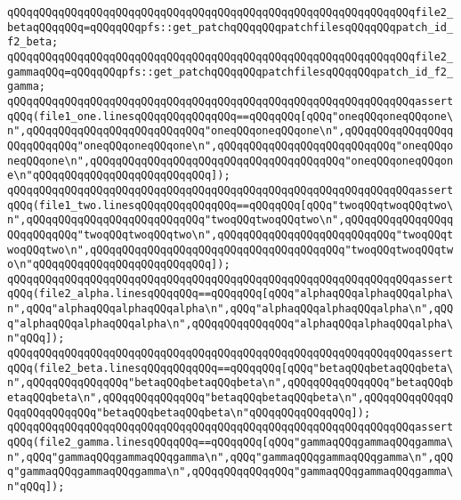 \verb|qQQqqQQqqQQqqQQqqQQqqQQqqQQqqQQqqQQqqQQqqQQqqQQqqQQqqQQqqQQqqQQqfile2_betaqQQqqQQq=qQQqqQQqpfs::get_patchqQQqqQQqpatchfilesqQQqqQQqpatch_id_f2_beta;|\newline
\verb|qQQqqQQqqQQqqQQqqQQqqQQqqQQqqQQqqQQqqQQqqQQqqQQqqQQqqQQqqQQqqQQqfile2_gammaqQQq=qQQqqQQqpfs::get_patchqQQqqQQqpatchfilesqQQqqQQqpatch_id_f2_gamma;|\newline
\newline
\verb|qQQqqQQqqQQqqQQqqQQqqQQqqQQqqQQqqQQqqQQqqQQqqQQqqQQqqQQqqQQqqQQqassertqQQq(file1_one.linesqQQqqQQqqQQqqQQq==qQQqqQQq[qQQq"oneqQQqoneqQQqone\n",qQQqqQQqqQQqqQQqqQQqqQQqqQQq"oneqQQqoneqQQqone\n",qQQqqQQqqQQqqQQqqQQqqQQqqQQq"oneqQQqoneqQQqone\n",qQQqqQQqqQQqqQQqqQQqqQQqqQQq"oneqQQqoneqQQqone\n",qQQqqQQqqQQqqQQqqQQqqQQqqQQqqQQqqQQqqQQq"oneqQQqoneqQQqone\n"qQQqqQQqqQQqqQQqqQQqqQQqqQQq]);|\newline
\verb|qQQqqQQqqQQqqQQqqQQqqQQqqQQqqQQqqQQqqQQqqQQqqQQqqQQqqQQqqQQqqQQqassertqQQq(file1_two.linesqQQqqQQqqQQqqQQq==qQQqqQQq[qQQq"twoqQQqtwoqQQqtwo\n",qQQqqQQqqQQqqQQqqQQqqQQqqQQq"twoqQQqtwoqQQqtwo\n",qQQqqQQqqQQqqQQqqQQqqQQqqQQq"twoqQQqtwoqQQqtwo\n",qQQqqQQqqQQqqQQqqQQqqQQqqQQq"twoqQQqtwoqQQqtwo\n",qQQqqQQqqQQqqQQqqQQqqQQqqQQqqQQqqQQqqQQq"twoqQQqtwoqQQqtwo\n"qQQqqQQqqQQqqQQqqQQqqQQqqQQq]);|\newline
\newline
\verb|qQQqqQQqqQQqqQQqqQQqqQQqqQQqqQQqqQQqqQQqqQQqqQQqqQQqqQQqqQQqqQQqassertqQQq(file2_alpha.linesqQQqqQQq==qQQqqQQq[qQQq"alphaqQQqalphaqQQqalpha\n",qQQq"alphaqQQqalphaqQQqalpha\n",qQQq"alphaqQQqalphaqQQqalpha\n",qQQq"alphaqQQqalphaqQQqalpha\n",qQQqqQQqqQQqqQQq"alphaqQQqalphaqQQqalpha\n"qQQq]);|\newline
\verb|qQQqqQQqqQQqqQQqqQQqqQQqqQQqqQQqqQQqqQQqqQQqqQQqqQQqqQQqqQQqqQQqassertqQQq(file2_beta.linesqQQqqQQqqQQq==qQQqqQQq[qQQq"betaqQQqbetaqQQqbeta\n",qQQqqQQqqQQqqQQq"betaqQQqbetaqQQqbeta\n",qQQqqQQqqQQqqQQq"betaqQQqbetaqQQqbeta\n",qQQqqQQqqQQqqQQq"betaqQQqbetaqQQqbeta\n",qQQqqQQqqQQqqQQqqQQqqQQqqQQq"betaqQQqbetaqQQqbeta\n"qQQqqQQqqQQqqQQq]);|\newline
\verb|qQQqqQQqqQQqqQQqqQQqqQQqqQQqqQQqqQQqqQQqqQQqqQQqqQQqqQQqqQQqqQQqassertqQQq(file2_gamma.linesqQQqqQQq==qQQqqQQq[qQQq"gammaqQQqgammaqQQqgamma\n",qQQq"gammaqQQqgammaqQQqgamma\n",qQQq"gammaqQQqgammaqQQqgamma\n",qQQq"gammaqQQqgammaqQQqgamma\n",qQQqqQQqqQQqqQQq"gammaqQQqgammaqQQqgamma\n"qQQq]);|\newline
\newline
\newline
\newline
